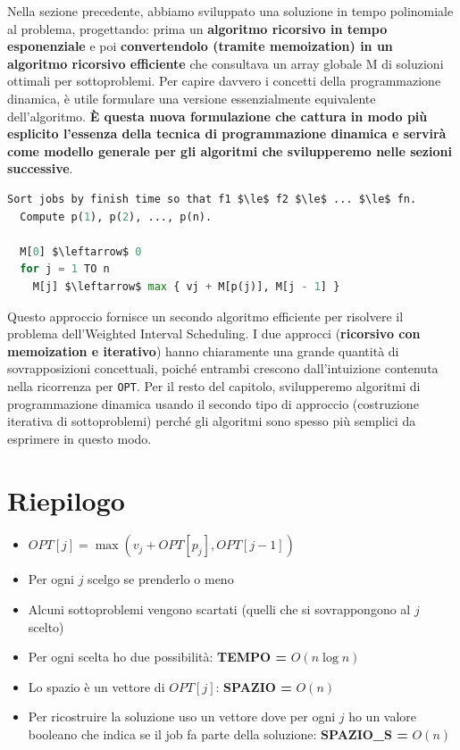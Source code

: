 Nella sezione precedente, abbiamo sviluppato una soluzione in tempo
polinomiale al problema, progettando: prima un \textbf{algoritmo
      ricorsivo in tempo esponenziale} e poi \textbf{convertendolo (tramite
      memoization) in un algoritmo ricorsivo efficiente} che consultava un
array globale M di soluzioni ottimali per sottoproblemi. Per capire
davvero i concetti della programmazione dinamica, è utile formulare una
versione essenzialmente equivalente dell'algoritmo. \textbf{È questa
      nuova formulazione che cattura in modo più esplicito l'essenza della
      tecnica di programmazione dinamica e servirà come modello generale per
      gli algoritmi che svilupperemo nelle sezioni successive}.

\begin{lstlisting}[language=Python, mathescape=true]
Sort jobs by finish time so that f1 $\le$ f2 $\le$ ... $\le$ fn. 
  Compute p(1), p(2), ..., p(n).
  
  M[0] $\leftarrow$ 0
  for j = 1 TO n
    M[j] $\leftarrow$ max { vj + M[p(j)], M[j - 1] }
\end{lstlisting}

Questo approccio fornisce un secondo algoritmo efficiente per risolvere
il problema dell'Weighted Interval Scheduling. I due approcci
(\textbf{ricorsivo con memoization e iterativo}) hanno chiaramente una
grande quantità di sovrapposizioni concettuali, poiché entrambi crescono
dall'intuizione contenuta nella ricorrenza per \texttt{OPT}. Per il
resto del capitolo, svilupperemo algoritmi di programmazione dinamica
usando il secondo tipo di approccio (costruzione iterativa di
sottoproblemi) perché gli algoritmi sono spesso più semplici da
esprimere in questo modo.
\newpage

\section{Riepilogo}

\begin{itemize}
      \item $OPT[j] = \max(v_j+OPT[p_j],OPT[j-1])$
      \item Per ogni $j$ scelgo se prenderlo o meno
      \item Alcuni sottoproblemi vengono scartati (quelli che si sovrappongono al
            $j$ scelto)
      \item Per ogni scelta ho due possibilità: \textbf{TEMPO =} $O(n \log n)$
      \item Lo spazio è un vettore di $OPT[j]$: \textbf{SPAZIO =} $O(n)$
      \item Per ricostruire la soluzione uso un vettore dove per ogni $j$ ho un
            valore booleano che indica se il job fa parte della soluzione:
            \textbf{SPAZIO\_S =} $O(n)$
\end{itemize}
